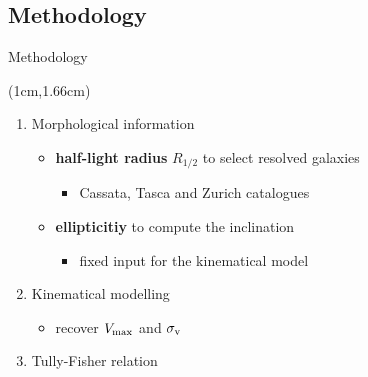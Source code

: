 \documentclass[usenames,dvipsnames]{beamer}
\begin{document}
\subsection{Methodology}
\begin{frame}{Methodology}

	\begin{textblock*}{10cm}(1cm,1.66cm)
  	\end{textblock*}

	\color{white}
	\begin{enumerate}[label={\Roman*.}]
		\item Morphological information

		\begin{itemize}[label=$\rhd$]
			\item \textbf{half-light radius} $R_{1/2}$ to select resolved galaxies
			\begin{itemize}[label=$\cdot$]
				\item Cassata, Tasca and Zurich catalogues
			\end{itemize}
			\item \textbf{ellipticitiy} to compute the inclination
			\begin{itemize}[label=$\cdot$]
				\item fixed input for the kinematical model
			\end{itemize}		
		\end{itemize}
		
		\vfill		
		
		\item Kinematical modelling
			\begin{itemize}[label=$\rhd$]
				\item recover $V_{\rm{max}}$ and $\sigma_{\rm{v}}$
			\end{itemize}
		
		\vfill		
		
		\item Tully-Fisher relation
	\end{enumerate}	
\end{frame}


\end{document}
